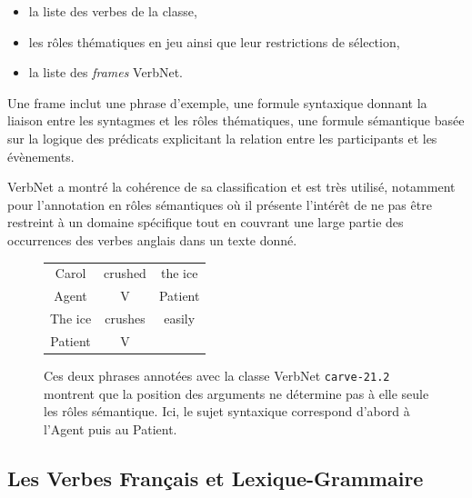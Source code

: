 \begin{itemize}
        \item la liste des verbes de la classe,
        \item les rôles thématiques en jeu ainsi que leur restrictions de sélection,
        \item la liste des \emph{frames} VerbNet.
\end{itemize}

Une frame inclut une phrase d'exemple, une formule syntaxique donnant la
liaison entre les syntagmes et les rôles thématiques, une formule sémantique
basée sur la logique des prédicats explicitant la relation entre les
participants et les évènements.



 VerbNet a montré la cohérence de sa classification et est très
utilisé, notamment pour l'annotation en rôles sémantiques
\citep{swier2005exploiting,palmer2013semantic} où il présente l'intérêt de ne
pas être restreint à un domaine spécifique tout en couvrant une large partie
des occurrences des verbes anglais dans un texte donné.

\begin{figure}[ht]
    \centering
    \begin{tabular}{ccc}
        \toprule
        Carol & crushed   & the ice \\
        Agent & V         & Patient \\
        \midrule
        The ice & crushes & easily  \\
        Patient & V       &         \\
        \bottomrule
    \end{tabular}

    \caption{\label{fig:example_srl}Ces deux phrases annotées avec la classe
    VerbNet \texttt{carve-21.2} montrent que la position des arguments ne
détermine pas à elle seule les rôles sémantique. Ici, le sujet syntaxique
correspond d'abord à l'Agent puis au Patient.}

\end{figure}


\subsection{Les Verbes Français et Lexique-Grammaire}

